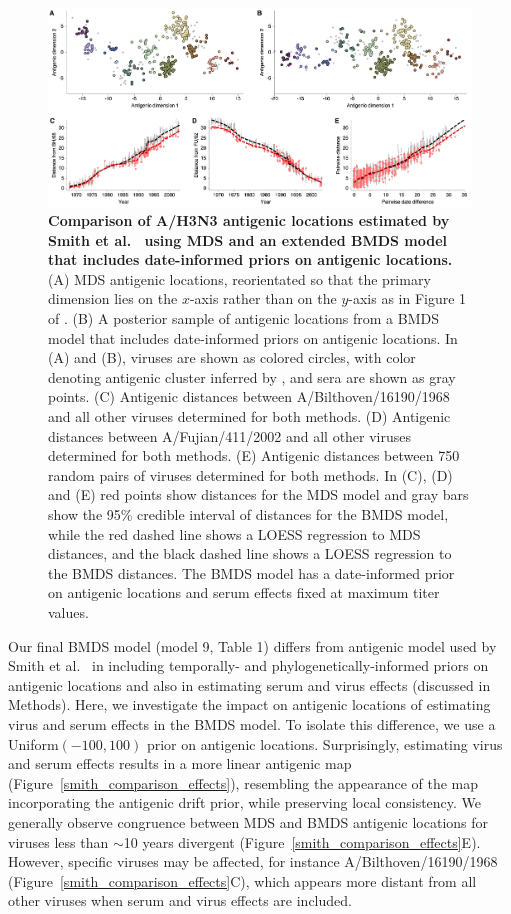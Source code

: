 \documentclass[11pt,oneside,letterpaper]{article}
\begin{document}
\begin{figure}[H]
	\centering		
	\includegraphics[width=1.0\textwidth]{figures/smith_comparison_drift}
	\caption{\textbf{Comparison of A/H3N3 antigenic locations estimated by Smith et al.\ \cite{Smith04} using MDS and an extended BMDS model that includes date-informed priors on antigenic locations.} 
	(A) MDS antigenic locations, reorientated so that the primary dimension lies on the $x$-axis rather than on the $y$-axis as in Figure 1 of \cite{Smith04}.
	(B) A posterior sample of antigenic locations from a BMDS model that includes date-informed priors on antigenic locations.
	In (A) and (B), viruses are shown as colored circles, with color denoting antigenic cluster inferred by \cite{Smith04}, and sera are shown as gray points.
	(C) Antigenic distances between A/Bilthoven/16190/1968 and all other viruses determined for both methods.
	(D) Antigenic distances between A/Fujian/411/2002 and all other viruses determined for both methods.
	(E) Antigenic distances between 750 random pairs of viruses determined for both methods.	
	In (C), (D) and (E) red points show distances for the MDS model and gray bars show the 95\% credible interval of distances for the BMDS model, while the red dashed line shows a LOESS regression to MDS distances, and the black dashed line shows a LOESS regression to the BMDS distances.
	The BMDS model has a date-informed prior on antigenic locations and serum effects fixed at maximum titer values. 	
	} 
	\label{smith_comparison_drift} 
\end{figure}

Our final BMDS model (model 9, Table 1) differs from antigenic model used by Smith et al.\ \cite{Smith04} in including temporally- and phylogenetically-informed priors on antigenic locations and also in estimating serum and virus effects (discussed in Methods).
Here, we investigate the impact on antigenic locations of estimating virus and serum effects in the BMDS model.
To isolate this difference, we use a Uniform$(-100,100)$ prior on antigenic locations.
Surprisingly, estimating virus and serum effects results in a more linear antigenic map (Figure~\ref{smith_comparison_effects}), resembling the appearance of the map incorporating the antigenic drift prior, while preserving local consistency.
We generally observe congruence between MDS and BMDS antigenic locations for viruses less than $\sim$10 years divergent (Figure~\ref{smith_comparison_effects}E).
However, specific viruses may be affected, for instance A/Bilthoven/16190/1968 (Figure~\ref{smith_comparison_effects}C), which appears more distant from all other viruses when serum and virus effects are included.
\end{document}
